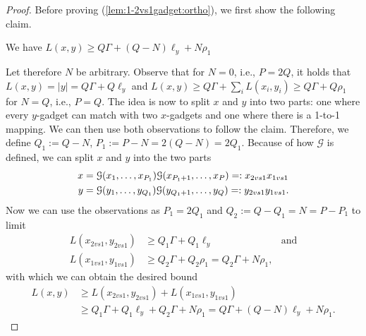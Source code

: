 \begin{proof}
Before proving (\ref{lem:1-2vs1gadget:ortho}), we first show the following claim.
\begin{claim}
\label{claim:1-2vs1-gadget-lb}
We have $L(x,y) \geq Q\Gamma + (Q-N)\ell_y + N\rho_1$
\end{claim} 
Let therefore $N$ be arbitrary.
Observe that for $N=0$, i.e., $P=2Q$, it holds that $L(x,y) = |y| = Q\Gamma + Q\ell_y$ and $L(x,y) \geq Q\Gamma + \sum_i L(x_i, y_i) \geq Q\Gamma + Q\rho_1$ for $N=Q$, i.e., $P = Q$.
The idea is now to split $x$ and $y$ into two parts: one where every $y$-gadget can match with two $x$-gadgets and one where there is a 1-to-1 mapping.
We can then use both observations to follow the claim.
Therefore, we define $Q_1 := Q-N$, $P_1 := P-N = 2(Q-N) = 2Q_1$.
Because of how $\mathcal{G}$ is defined, we can split $x$ and $y$ into the two parts
\begin{align*}
x &= \lLCSGadget{x_1, \ldots, x_{P_1}}\lLCSGadget{x_{P_1+1}, \ldots, x_{P}} =: x_{2vs1}x_{1vs1} \\
%
y &= \lLCSGadget{y_1, \ldots, y_{Q_1}}\lLCSGadget{y_{Q_1+1}, \ldots, y_{Q}} =: y_{2vs1}y_{1vs1}.
\end{align*}
%
Now we can use the observations as $P_1 = 2Q_1$ and $Q_2 := Q - Q_1 = N = P - P_1$ to limit 
\begin{align*}
L(x_{2vs1}, y_{2vs1}) &\geq Q_1\Gamma + Q_1\ell_y %
& \text{and}\\
%
L(x_{1vs1}, y_{1vs1}) &\geq Q_2\Gamma + Q_2\rho_1 = Q_2\Gamma + N\rho_1, 
\end{align*}
with which we can obtain the desired bound
\begin{align*}
L(x,y) &\geq L(x_{2vs1}, y_{2vs1}) + L(x_{1vs1}, y_{1vs1}) \\
	&\geq Q_1\Gamma + Q_1\ell_y + Q_2\Gamma + N\rho_1 = Q\Gamma + (Q-N)\ell_y + N\rho_1.
\end{align*}




\end{proof}
